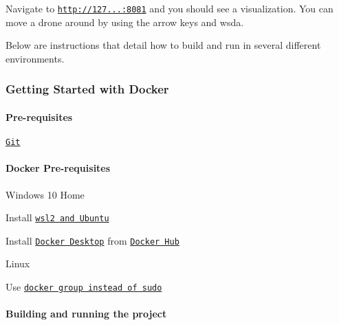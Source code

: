 Navigate to \href{http://127.0.0.1:8081}{\tt http\+://127...\+:8081} and you should see a visualization. You can move a drone around by using the arrow keys and wsda.

Below are instructions that detail how to build and run in several different environments.

\subsubsection*{Getting Started with Docker}

\paragraph*{Pre-\/requisites}


\begin{DoxyItemize}
\item \href{https://git-scm.com/}{\tt Git}
\end{DoxyItemize}

\paragraph*{Docker Pre-\/requisites}


\begin{DoxyItemize}
\item Windows 10 Home
\begin{DoxyItemize}
\item Install \href{https://www.youtube.com/watch?v=ilKQHAFeQR0&list=RDCMUCzLbHrU7U3cUDNQWWAqjceA&start_radio=1&t=7}{\tt wsl2 and Ubuntu}
\end{DoxyItemize}
\item Install \href{https://hub.docker.com/?overlay=onboarding}{\tt Docker Desktop} from \href{https://hub.docker.com/}{\tt Docker Hub}
\item Linux
\begin{DoxyItemize}
\item Use \href{https://www.digitalocean.com/community/tutorials/how-to-install-and-use-docker-on-ubuntu-18-04}{\tt docker group instead of sudo}
\end{DoxyItemize}
\end{DoxyItemize}

\paragraph*{Building and running the project}


